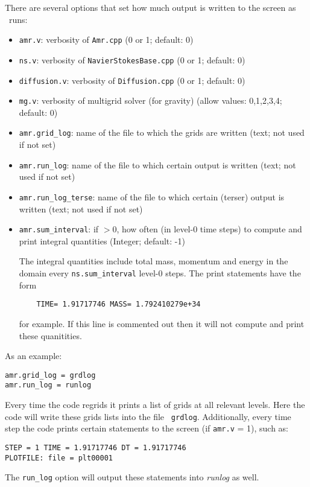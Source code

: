 There are several options that set how much output is written to the
screen as \iamr\ runs:
\begin{itemize}
\item {\tt amr.v}: verbosity of {\tt Amr.cpp} (0 or 1; default: 0)

\item {\tt ns.v}: verbosity of {\tt NavierStokesBase.cpp} (0 or 1; default: 0)

\item {\tt diffusion.v}: verbosity of {\tt Diffusion.cpp} (0 or 1; default: 0)
  
\item {\tt mg.v}: verbosity of multigrid solver (for gravity) (allow
  values: 0,1,2,3,4; default: 0)
  
\item {\tt amr.grid\_log}: name of the file to which the grids are
  written (text; not used if not set)
  
\item {\tt amr.run\_log}: name of the file to which certain output is
  written (text; not used if not set)
  
\item {\tt amr.run\_log\_terse}: name of the file to which certain
  (terser) output is written (text; not used if not set)
  
\item {\tt amr.sum\_interval}: if $> 0$, how often (in level-0 time
  steps) to compute and print integral quantities (Integer; default: -1)

  The integral quantities include total mass, momentum and energy in
  the domain every {\tt ns.sum\_interval} level-0 steps.
  The print statements have the form
  \begin{verbatim}
    TIME= 1.91717746 MASS= 1.792410279e+34
  \end{verbatim}
  for example.  If this line is commented out then
  it will not compute and print these quanitities.

\end{itemize}

As an example:
\begin{lstlisting}
amr.grid_log = grdlog
amr.run_log = runlog 
\end{lstlisting}  
Every time the code regrids it prints a list of grids at all relevant
levels.  Here the code will write these grids lists into the file {\tt
  grdlog}.  Additionally, every time step the code prints certain
statements to the screen (if {\tt amr.v} = 1), such as:
\begin{verbatim}
STEP = 1 TIME = 1.91717746 DT = 1.91717746 
PLOTFILE: file = plt00001 
\end{verbatim}
The {\tt run\_log} option will output these statements into {\em
  runlog} as well.

